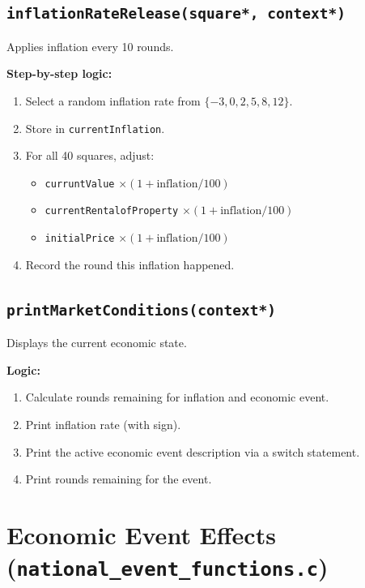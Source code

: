 \documentclass[12pt,a4paper]{article}
\begin{document}
\subsection{\texttt{inflationRateRelease(square*, context*)}}
Applies inflation every 10 rounds.

\textbf{Step-by-step logic:}
\begin{enumerate}[noitemsep]
    \item Select a random inflation rate from $\{-3, 0, 2, 5, 8, 12\}$.
    \item Store in \texttt{currentInflation}.
    \item For all 40 squares, adjust:
    \begin{itemize}[noitemsep]
        \item \texttt{curruntValue} $\times (1 + \textrm{inflation}/100)$
        \item \texttt{currentRentalofProperty} $\times (1 + \textrm{inflation}/100)$
        \item \texttt{initialPrice} $\times (1 + \textrm{inflation}/100)$
    \end{itemize}
    \item Record the round this inflation happened.
\end{enumerate}

\subsection{\texttt{printMarketConditions(context*)}}
Displays the current economic state.

\textbf{Logic:}
\begin{enumerate}[noitemsep]
    \item Calculate rounds remaining for inflation and economic event.
    \item Print inflation rate (with sign).
    \item Print the active economic event description via a switch statement.
    \item Print rounds remaining for the event.
\end{enumerate}

\newpage

\section{Economic Event Effects (\texttt{national\_event\_functions.c})}
\end{document}
